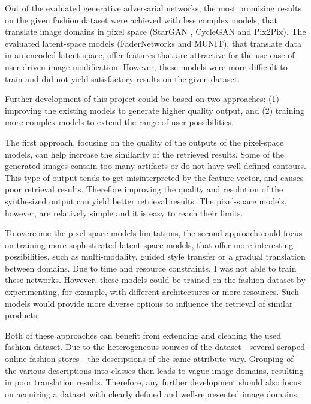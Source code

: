 \documentclass[12pt]{report}
\begin{document}
Out of the evaluated generative adversarial networks, the most promising results on the given fashion dataset were achieved with less complex models, that translate image domains in pixel space (StarGAN \cite{choi_stargan_2017}, CycleGAN\cite{zhu_unpaired_2017} and Pix2Pix\cite{isola_image--image_2016}). The evaluated latent-space models (FaderNetworks\cite{lample_fader_2017} and MUNIT\cite{huang_multimodal_2018}), that translate data in an encoded latent space, offer features that are attractive for the use case of user-driven image modification. However, these models were more difficult to train and did not yield satisfactory results on the given dataset.

Further development of this project could be based on two approaches: (1) improving the existing models to generate higher quality output, and (2) training more complex models to extend the range of user possibilities. 

The first approach, focusing on the quality of the outputs of the pixel-space models, can help increase the similarity of the retrieved results. Some of the generated images contain too many artifacts or do not have well-defined contours. This type of output tends to get misinterpreted by the feature vector, and causes poor retrieval results. Therefore improving the quality and resolution of the synthesized output can yield better retrieval results. The pixel-space models, however, are relatively simple and it is easy to reach their limits. 

To overcome the pixel-space models limitations, the second approach could focus on training more sophisticated latent-space models, that offer more interesting possibilities, such as multi-modality, guided style transfer or a gradual translation between domains. Due to time and resource constraints, I was not able to train these networks. However, these models could be trained on the fashion dataset by experimenting, for example, with different architectures or more resources. Such models would provide more diverse options to influence the retrieval of similar products.

Both of these approaches can benefit from extending and cleaning the used fashion dataset. Due to the heterogeneous sources of the dataset - several scraped online fashion stores - the descriptions of the same attribute vary. Grouping of the various descriptions into classes then leads to vague image domains, resulting in poor translation results. Therefore, any further development should also focus on acquiring a dataset with clearly defined and well-represented image domains.
\end{document}
